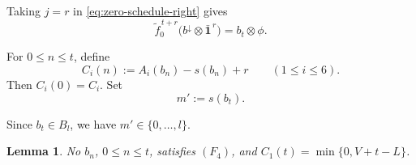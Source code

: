 \documentclass[11pt,reqno]{amsart}
\numberwithin{table}{section}
\numberwithin{equation}{section}
\theoremstyle{plain}
\newtheorem{lemma}[theorem]{Lemma}
\theoremstyle{definition}
\begin{document}
Taking \(j=r\) in \eqref{eq:zero-schedule-right} gives
\begin{equation}\label{eq:zero-schedule-endpoint}
	\widetilde f_0^{\,t+r}
	\bigl(b^\downarrow\otimes\bar{\mathbf1}^{\,r}\bigr)
	=
	b_t\otimes\phi.
\end{equation}

For \(0\le n\le t\), define
\begin{equation}\label{eq:Cin-def}
	C_i(n)
	:=
	A_i(b_n)-s(b_n)+r
	\qquad(1\le i\le6).
\end{equation}
Then \(C_i(0)=C_i\).  Set
\begin{equation}\label{eq:mprime-def}
	m':=s(b_t).
\end{equation}

Since \(b_t\in B_l\), we have \(m'\in\{0,\ldots,l\}\).

\begin{lemma}\label{lem:terminal-C1}
	No \(b_n\), \(0\le n\le t\), satisfies \((F_4)\), and $C_1(t)=\min\{0,V+t-L\}$.
\end{lemma}
\end{document}
